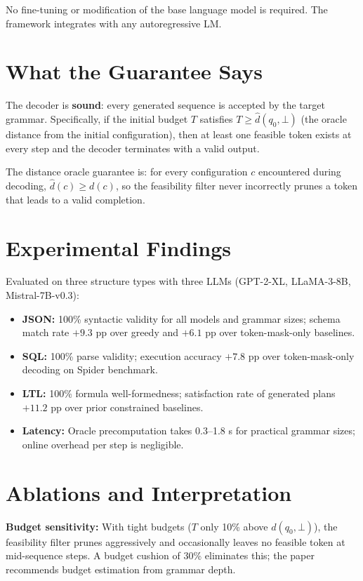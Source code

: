 \documentclass[10pt,twocolumn]{article}
\begin{document}
No fine-tuning or modification of the base language model is required.
The framework integrates with any autoregressive LM.

\section{What the Guarantee Says}

The decoder is \textbf{sound}: every generated sequence is accepted by
the target grammar. Specifically, if the initial budget $T$ satisfies
$T \geq \hat{d}(q_0, \bot)$ (the oracle distance from the initial
configuration), then at least one feasible token exists at every step
and the decoder terminates with a valid output.

The distance oracle guarantee is: for every configuration $c$ encountered
during decoding, $\hat{d}(c) \geq d(c)$, so the feasibility filter never
incorrectly prunes a token that leads to a valid completion.

\section{Experimental Findings}

Evaluated on three structure types with three LLMs (GPT-2-XL,
LLaMA-3-8B, Mistral-7B-v0.3):

\begin{itemize}[itemsep=2pt,parsep=0pt]
  \item \textbf{JSON:} 100\% syntactic validity for all models and
    grammar sizes; schema match rate $+9.3$ pp over greedy and $+6.1$ pp
    over token-mask-only baselines.
  \item \textbf{SQL:} 100\% parse validity; execution accuracy $+7.8$ pp
    over token-mask-only decoding on Spider benchmark.
  \item \textbf{LTL:} 100\% formula well-formedness; satisfaction rate
    of generated plans $+11.2$ pp over prior constrained baselines.
  \item \textbf{Latency:} Oracle precomputation takes 0.3--1.8 s for
    practical grammar sizes; online overhead per step is negligible.
\end{itemize}

\section{Ablations and Interpretation}

\textbf{Budget sensitivity:} With tight budgets ($T$ only 10\% above
$d(q_0, \bot)$), the feasibility filter prunes aggressively and
occasionally leaves no feasible token at mid-sequence steps. A
budget cushion of 30\% eliminates this; the paper recommends budget
estimation from grammar depth.
\end{document}

